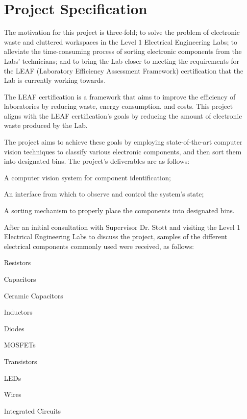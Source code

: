 \section{Project Specification}
\label{sec:project-specification}
The motivation for this project is three-fold; to solve the problem of electronic waste and cluttered workspaces in the Level 1 Electrical Engineering Labs;
to alleviate the time-consuming process of sorting electronic components from the Labs' technicians; and 
to bring the Lab closer to meeting the requirements for the LEAF (Laboratory Efficiency Assessment Framework) certification\cite{leaf} that
the Lab is currently working towards.

The LEAF certification is a framework that aims to improve the efficiency of laboratories by reducing waste, energy consumption, and costs.
This project aligns with the LEAF certification's goals by reducing the amount of electronic waste produced by the Lab.

The project aims to achieve these goals by employing state-of-the-art computer vision techniques to classify various electronic components,
and then sort them into designated bins. The project's deliverables are as follows:
\begin{mylist}
  \item A computer vision system for component identification;
  \item An interface from which to observe and control the system's state;
  \item A sorting mechanism to properly place the components into designated bins.
\end{mylist} 
\noindent
After an initial consultation with Supervisor Dr. Stott and visiting the Level 1 Electrical Engineering Labs to discuss the project,
samples of the different electrical components commonly used were received, as follows:
\begin{multicols}{2}
  \begin{mylist}
    \item Resistors
    \item Capacitors
    \item Ceramic Capacitors
    \item Inductors
    \item Diodes
    \item MOSFETs
    \item Transistors
    \item LEDs
    \item Wires
    \item Integrated Circuits
  \end{mylist}
\end{multicols}

